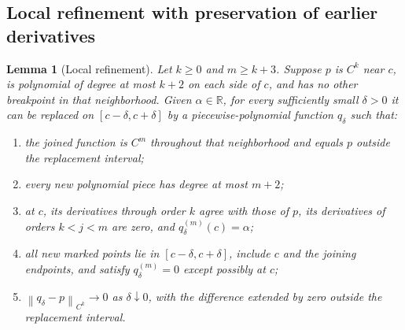 \documentclass[11pt,reqno]{amsart}
\numberwithin{equation}{section}
\newtheorem{lemma}[theorem]{Lemma}
\theoremstyle{definition}
\theoremstyle{remark}
\newcommand{\R}{\mathbb R}
\newcommand{\norm}[1]{\left\lVert #1\right\rVert}
\begin{document}
\subsection{Local refinement with preservation of earlier derivatives}
\begin{lemma}[Local refinement]\label{ho:lem:refine}
Let $k\ge0$ and $m\ge k+3$. Suppose $p$ is $C^k$ near $c$, is polynomial of degree at most $k+2$ on each side of $c$, and has no other breakpoint in that neighborhood. Given $\alpha\in\R$, for every sufficiently small $\delta>0$ it can be replaced on $[c-\delta,c+\delta]$ by a piecewise-polynomial function $q_\delta$ such that:
\begin{enumerate}[label=\textup{(\roman*)},leftmargin=2.4em]
\item the joined function is $C^m$ throughout that neighborhood and equals $p$ outside the replacement interval;
\item every new polynomial piece has degree at most $m+2$;
\item at $c$, its derivatives through order $k$ agree with those of $p$, its derivatives of orders $k<j<m$ are zero, and $q_\delta^{(m)}(c)=\alpha$;
\item all new marked points lie in $[c-\delta,c+\delta]$, include $c$ and the joining endpoints, and satisfy $q_\delta^{(m)}=0$ except possibly at $c$;
\item $\norm{q_\delta-p}_{C^k}\to0$ as $\delta\downarrow0$, with the difference extended by zero outside the replacement interval.
\end{enumerate}
\end{lemma}
\end{document}
